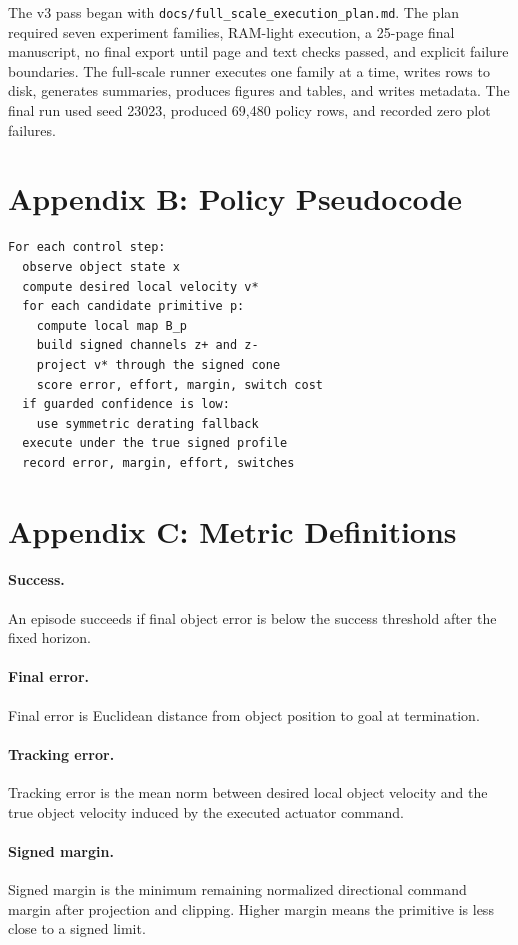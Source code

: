 \documentclass{article}
\begin{document}
The v3 pass began with \texttt{docs/full\_scale\_execution\_plan.md}. The plan required seven experiment families, RAM-light execution, a 25-page final manuscript, no final export until page and text checks passed, and explicit failure boundaries. The full-scale runner executes one family at a time, writes rows to disk, generates summaries, produces figures and tables, and writes metadata. The final run used seed 23023, produced 69,480 policy rows, and recorded zero plot failures.

\section{Appendix B: Policy Pseudocode}

\begin{verbatim}
For each control step:
  observe object state x
  compute desired local velocity v*
  for each candidate primitive p:
    compute local map B_p
    build signed channels z+ and z-
    project v* through the signed cone
    score error, effort, margin, switch cost
  if guarded confidence is low:
    use symmetric derating fallback
  execute under the true signed profile
  record error, margin, effort, switches
\end{verbatim}

\section{Appendix C: Metric Definitions}

\paragraph{Success.}
An episode succeeds if final object error is below the success threshold after the fixed horizon.

\paragraph{Final error.}
Final error is Euclidean distance from object position to goal at termination.

\paragraph{Tracking error.}
Tracking error is the mean norm between desired local object velocity and the true object velocity induced by the executed actuator command.

\paragraph{Signed margin.}
Signed margin is the minimum remaining normalized directional command margin after projection and clipping. Higher margin means the primitive is less close to a signed limit.
\end{document}
